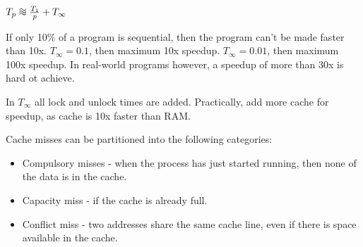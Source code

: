\documentclass{article}
\newcommand*{\approxident}{%
  \mathrel{\vcenter{\offinterlineskip
  \hbox{$\sim$}\vskip-.35ex\hbox{$\sim$}\vskip-.35ex\hbox{$\sim$}}}}
\begin{document}
$T_p \approxident \frac{T_1}{p} + T_\infty$

If only 10\% of a program is sequential, then the program can't be made faster than 10x.
$T_\infty = 0.1$, then maximum 10x speedup.  
$T_\infty = 0.01$, then maximum 100x speedup.  
In real-world programs however, a speedup of more than 30x is hard ot achieve.

In $T_\infty$ all lock and unlock times are added.
Practically, add more cache for speedup, as cache is 10x faster than RAM.

Cache misses can be partitioned into the following categories:
\begin{itemize}
    \item Compulsory misses - when the process has just started running,
            then none of the data is in the cache.
    \item Capacity miss - if the cache is already full.
    \item Conflict miss - two addresses share the same cache line, even if there
            is space available in the cache.
\end{itemize}
\end{document}

